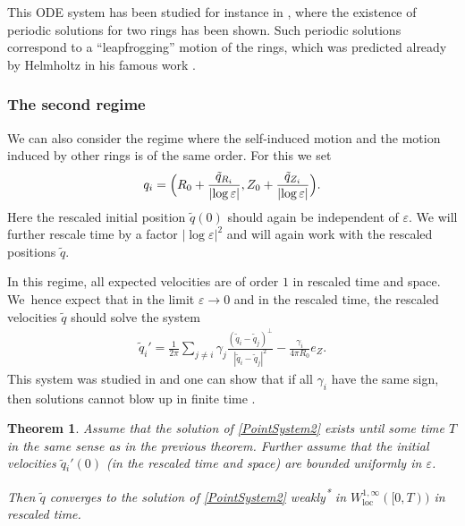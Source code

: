 \documentclass[JEP,XML,SOM,Unicode,published]{cedram}
\let\epsilon\varepsilon
\newcommand{\loc}{\mathrm{loc}}
\newtheorem{theorem}{Theorem}[subsection]
\theoremstyle{definition}
\renewcommand\star{\textsuperscript{*} }
\newcommand\eq{=}
\let\eps\epsilon
\begin{document}
This ODE system has been studied for instance in \cite{JerrardSmets}, where the existence of periodic solutions for two rings has been shown. Such periodic solutions correspond to a ``leapfrogging'' motion of the rings, which was predicted already by Helmholtz in his famous work \cite{helmholtz1858integrale,helmholtz1867lxiii}.

\subsubsection{The second regime}

We can also consider the regime where the self-induced motion and the motion induced by other rings is of the same order. For this we set
\begin{align}\label{def regime2}
q_i\eq \Bigl(R_0+\frac{\tilde{q}_{R_i}}{|{\log\eps}|},Z_0+\frac{\tilde{q}_{Z_i}}{|{\log\eps}|}\Bigr).
\end{align}
Here the rescaled initial position $\tilde{q}(0)$ should again be independent of $\eps$.
We will further rescale time by a factor $|{\log\eps}|^2$ and will again work with the rescaled positions $\tilde{q}$.

In this regime, all expected velocities are of order $1$ in rescaled time and space.
We~hence expect that in the limit $\eps\to 0$ and in the rescaled time, the rescaled velocities $\tilde{q}$ should solve the system
\begin{align}\label{PointSystem2}
\tilde{q}_i'\eq\frac{1}{2\pi}\sum_{j\neq i}\gamma_j\frac{(\tilde{q}_i-\tilde{q}_j)^\perp}{|\tilde{q}_i-\tilde{q}_j|^2}-\frac{\gamma_i}{4\pi R_0}e_Z.
\end{align}
This system was studied in \cite{MarchioroNegrini2} and one can show that if all $\gamma_i$ have the same sign, then solutions cannot blow up in finite time \cite[Th.\,2.1]{MarchioroNegrini2}.

\begin{theorem}\label{Limit2}
Assume that the solution of \eqref{PointSystem2} exists until some time $T$ in the same sense as in the previous theorem. Further assume that the initial velocities $\tilde{q}{}_i'(0)$ (in the rescaled time and space) are bounded uniformly in $\eps$.

Then $\tilde{q}$ converges to the solution of \eqref{PointSystem2} weakly\star in $W_{\loc}^{1,\infty}([0,T))$ in rescaled time.
\end{theorem}
\end{document}
